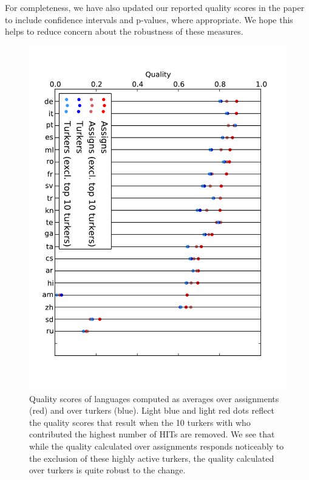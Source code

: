 \documentclass[11pt]{article}
\begin{document}
For completeness, we have also updated our reported quality scores in the paper to include confidence intervals and p-values, where appropriate. We hope this helps to reduce concern about the robustness of these measures.


\begin{figure}
\includegraphics[width=1\linewidth]{figures/quality_compare.pdf}
\caption{Quality scores of languages computed as averages over assignments (red) and over turkers (blue). Light blue and light red dots reflect the quality scores that result when the 10 turkers with who contributed the highest number of HITs are removed. We see that while the quality calculated over assignments responds noticeably to the exclusion of these highly active turkers, the quality calculated over turkers is quite robust to the change.}
\label{qual_dots}
\end{figure}
\end{document}

